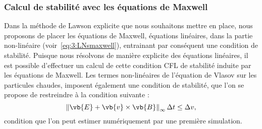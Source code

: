\subsubsection{Calcul de stabilité avec les équations de Maxwell}
\label{ssec:3:cflMaxwell}

Dans la méthode de Lawson explicite que nous souhaitons mettre en place, nous proposons de placer les équations de Maxwell, équations linéaires, dans la partie non-linéaire (voir~\eqref{eq:3:LNsmaxwell}), entrainant par conséquent une condition de stabilité. Puisque nous résolvons de manière explicite des équations linéaires, il est possible d'effectuer un calcul de cette condition CFL de stabilité induite par les équations de Maxwell. Les termes non-linéaires de l'équation de Vlasov sur les particules chaudes, imposent également une condition de stabilité, que l'on se propose de restreindre à la condition suivante :
$$
  \left\|\vb{E}+\vb{v}\times \vb{B}\right\|_{\infty} \Delta t \leq \Delta v,
$$
condition que l'on peut estimer numériquement par une première simulation.

